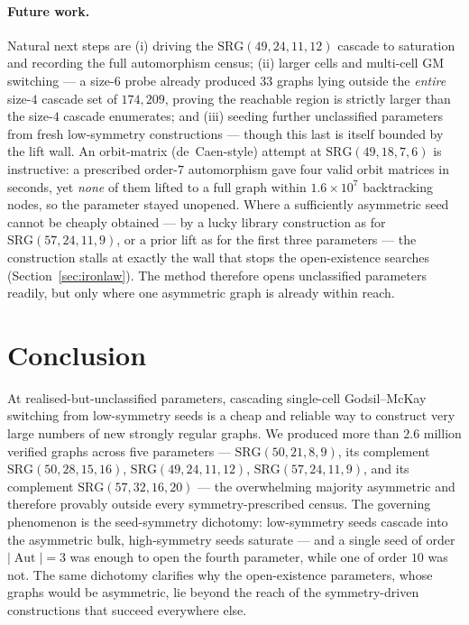 \documentclass[11pt]{article}
\theoremstyle{definition}
\newcommand{\SRG}[1]{\mathrm{SRG}(#1)}
\newcommand{\Aut}{\operatorname{Aut}}
\begin{document}
\paragraph{Future work.} Natural next steps are (i) driving the $\SRG{49,24,11,12}$
cascade to saturation and recording the full automorphism census; (ii) larger cells and
multi-cell GM switching --- a size-$6$ probe already produced $33$ graphs lying outside the
\emph{entire} size-$4$ cascade set of $174{,}209$, proving the reachable region is strictly
larger than the size-$4$ cascade enumerates; and (iii) seeding further unclassified parameters
from fresh low-symmetry constructions --- though this last is itself bounded by the lift wall.
An orbit-matrix (de~Caen-style) attempt at $\SRG{49,18,7,6}$ is instructive: a prescribed
order-$7$ automorphism gave four valid orbit matrices in seconds, yet \emph{none} of them lifted
to a full graph within $1.6\times 10^{7}$ backtracking nodes, so the parameter stayed unopened.
Where a sufficiently asymmetric seed cannot be cheaply obtained --- by a lucky library
construction as for $\SRG{57,24,11,9}$, or a prior lift as for the first three parameters --- the
construction stalls at exactly the wall that stops the open-existence searches
(Section~\ref{sec:ironlaw}). The method therefore opens unclassified parameters readily, but only
where one asymmetric graph is already within reach.

\section{Conclusion}

At realised-but-unclassified parameters, cascading single-cell Godsil--McKay switching
from low-symmetry seeds is a cheap and reliable way to construct very large numbers of new
strongly regular graphs. We produced more than $2.6$ million verified graphs across five
parameters --- $\SRG{50,21,8,9}$, its complement $\SRG{50,28,15,16}$,
$\SRG{49,24,11,12}$, $\SRG{57,24,11,9}$, and its complement $\SRG{57,32,16,20}$ --- the
overwhelming majority asymmetric and
therefore provably outside every symmetry-prescribed census. The governing phenomenon is the
seed-symmetry dichotomy: low-symmetry seeds cascade into the asymmetric bulk, high-symmetry
seeds saturate --- and a single seed of order $|\Aut|=3$ was enough to open the fourth
parameter, while one of order $10$ was not. The same dichotomy clarifies why the open-existence parameters, whose graphs
would be asymmetric, lie beyond the reach of the symmetry-driven constructions that
succeed everywhere else.
\end{document}
